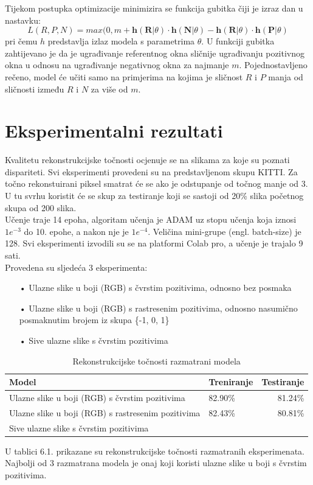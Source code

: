 \documentclass[times, utf8, zavrsni, numeric]{fer}
\begin{document}
\pagebreak
Tijekom postupka optimizacije minimizira se funkcija gubitka čiji je izraz dan u nastavku:
\begin{equation}
L(R, P, N) = max(0, m + \textbf{h}(\textbf{R}|\theta)\cdot \textbf{h}(\textbf{N}|\theta)-\textbf{h}(\textbf{R}|\theta)\cdot \textbf{h}(\textbf{P}|\theta)
\label{eq:gubitak}
\end{equation}
pri čemu $h$ predstavlja izlaz modela s parametrima $\theta$. U funkciji gubitka zahtijevano je da je ugrađivanje referentnog okna sličnije ugrađivanju pozitivnog okna u odnosu na ugrađivanje negativnog okna za najmanje $m$. Pojednostavljeno rečeno, model će učiti samo na primjerima na kojima je sličnost $R$ i $P$ manja od sličnosti između $R$ i $N$ za više od $m$.\cite{orsic}

\chapter{Eksperimentalni rezultati}
Kvalitetu rekonstrukcijske točnosti ocjenuje se na slikama za koje su poznati dispariteti. Svi eksperimenti provedeni su na predstavljenom skupu KITTI. Za točno rekonstuirani piksel smatrat će se ako je odstupanje od točnog manje od 3. U tu svrhu koristit će se skup za testiranje koji se sastoji od 20\% slika početnog skupa od 200 slika.\\
Učenje traje 14 epoha, algoritam učenja je ADAM uz stopu učenja koja iznosi $1e^{-3}$ do 10. epohe, a nakon nje je $1e^{-4}$. Veličina mini-grupe (engl. batch-size) je 128.  Svi eksperimenti izvodili su se na platformi Colab pro, a učenje je trajalo 9 sati.\\
Provedena su sljedeća 3 eksperimenta:
\begin{itemize}
\item[•]Ulazne slike u boji (RGB) s čvrstim pozitivima, odnosno bez posmaka
\item[•]Ulazne slike u boji (RGB) s rastresenim pozitivima, odnosno nasumično \linebreak posmaknutim brojem iz skupa \{-1, 0, 1\}
\item[•]Sive ulazne slike s čvrstim pozitivima
\end{itemize}

\begin{table}[htb]
\caption{Rekonstrukcijske točnosti razmatrani modela}
\label{tbl:konstante}
\centering
\begin{tabular}{llr} \hline
Model & Treniranje & Testiranje\\ \hline
Ulazne slike u boji (RGB) s čvrstim pozitivima & 82.90\% & 81.24\% \\
Ulazne slike u boji (RGB) s rastresenim pozitivima & 82.43\% & 80.81\% \\
Sive ulazne slike s čvrstim pozitivima &  &  \\ \hline
\end{tabular}
\end{table}
U tablici 6.1. prikazane su rekonstrukcijske točnosti razmatranih eksperimenata. Najbolji od 3 razmatrana modela je onaj koji koristi ulazne slike u boji s čvrstim pozitivima.\pagebreak
\end{document}
